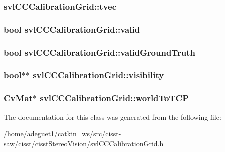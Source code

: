 \hypertarget{classsvl_c_c_calibration_grid_a08c42ea2dfe94cc29e5a18148d21448e}{
\subsubsection[{tvec}]{ svl\-C\-C\-Calibration\-Grid\-::tvec}}\label{classsvl_c_c_calibration_grid_a08c42ea2dfe94cc29e5a18148d21448e}
\hypertarget{classsvl_c_c_calibration_grid_a9d5cd80c8a24be914db2dcfb4535de01}{
\subsubsection[{valid}]{\setlength{\rightskip}{0pt plus 5cm}bool svl\-C\-C\-Calibration\-Grid\-::valid}}\label{classsvl_c_c_calibration_grid_a9d5cd80c8a24be914db2dcfb4535de01}
\hypertarget{classsvl_c_c_calibration_grid_a2edf34681f2c5476af187de836ddbb79}{
\subsubsection[{valid\-Ground\-Truth}]{\setlength{\rightskip}{0pt plus 5cm}bool svl\-C\-C\-Calibration\-Grid\-::valid\-Ground\-Truth}}\label{classsvl_c_c_calibration_grid_a2edf34681f2c5476af187de836ddbb79}
\hypertarget{classsvl_c_c_calibration_grid_a7022b0856e07b5004a767fdd80d78e4a}{
\subsubsection[{visibility}]{\setlength{\rightskip}{0pt plus 5cm}bool$\ast$$\ast$ svl\-C\-C\-Calibration\-Grid\-::visibility}}\label{classsvl_c_c_calibration_grid_a7022b0856e07b5004a767fdd80d78e4a}
\hypertarget{classsvl_c_c_calibration_grid_a76795dc4a6916d8c4cc6c2eec54bf049}{
\subsubsection[{world\-To\-T\-C\-P}]{\setlength{\rightskip}{0pt plus 5cm}Cv\-Mat$\ast$ svl\-C\-C\-Calibration\-Grid\-::world\-To\-T\-C\-P}}\label{classsvl_c_c_calibration_grid_a76795dc4a6916d8c4cc6c2eec54bf049}


The documentation for this class was generated from the following file\-:\begin{DoxyCompactItemize}
\item 
/home/adeguet1/catkin\-\_\-ws/src/cisst-\/saw/cisst/cisst\-Stereo\-Vision/\hyperlink{svl_c_c_calibration_grid_8h}{svl\-C\-C\-Calibration\-Grid.\-h}\end{DoxyCompactItemize}
